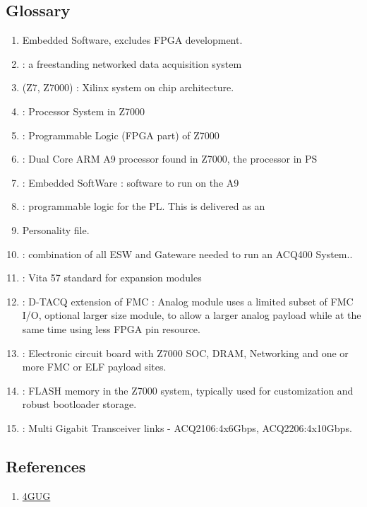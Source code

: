 \documentclass[]{article}
\begin{document}
\subsection{Glossary}
\begin{enumerate}
    \item {} Embedded Software, excludes FPGA development.
    \item {}: a freestanding networked data acquisition system
    \item {} (Z7, Z7000)  : Xilinx system on chip architecture.
    \item {} : Processor System in Z7000
    \item {} : Programmable Logic (FPGA part) of Z7000
    \item {} : Dual Core ARM A9 processor found in Z7000, the processor in PS
    \item {} : Embedded SoftWare : software to run on the A9
    \item {}: programmable logic for the PL. This is delivered as an 
    \item {} Personality file.
    \item {}: combination of all ESW and Gateware needed to run an ACQ400 System..
    \item {}: Vita 57 standard for expansion modules
    \item {} : D-TACQ extension of FMC : Analog module uses a limited subset of FMC I/O, optional larger size module, to allow a larger analog payload while at the same time using less FPGA pin resource.
    \item {}: Electronic circuit board with Z7000 SOC, DRAM, Networking and one or more FMC or ELF payload sites.
    \item {}: FLASH memory in the Z7000 system, typically used for customization and robust bootloader storage.  
    \item {}: Multi Gigabit Transceiver links - ACQ2106:4x6Gbps, ACQ2206:4x10Gbps.
\end{enumerate}

\subsection{References}
\begin{enumerate}
    \item \href{https://github.com/seanalsop/bolodsp-doc/releases}{4GUG}
\end{enumerate} 
\end{document}
